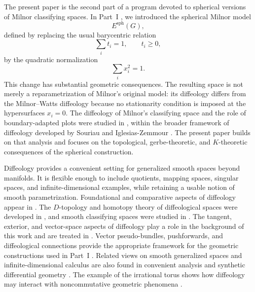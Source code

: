 \documentclass[11pt]{amsart}
\begin{document}
The present paper is the second part of a program devoted to spherical
versions of Milnor classifying spaces. In Part~I \cite{Magnot-MilnorI}, we
introduced the spherical Milnor model
\[
E^{\mathrm{sph}}(G),
\]
defined by replacing the usual barycentric relation
\[
\sum_i t_i=1,\qquad t_i\geq0,
\]
by the quadratic normalization
\[
\sum_i x_i^2=1.
\]
This change has substantial geometric consequences. The resulting space is not
merely a reparametrization of Milnor's original model: its diffeology differs
from the Milnor--Watts diffeology because no stationarity condition is imposed
at the hypersurfaces \(x_i=0\). The diffeology of Milnor's classifying space
and the role of boundary-adapted plots were studied in \cite{MagnotWatts2017},
within the broader framework of diffeology developed by Souriau and
Iglesias-Zemmour \cite{Souriau1980,IglesiasZemmour2013}. The present paper
builds on that analysis and focuses on the topological, gerbe-theoretic, and
\(K\)-theoretic consequences of the spherical construction.

Diffeology provides a convenient setting for generalized smooth spaces beyond
manifolds. It is flexible enough to include quotients, mapping spaces,
singular spaces, and infinite-dimensional examples, while retaining a usable
notion of smooth parametrization. Foundational and comparative aspects of
diffeology appear in \cite{Hector1995,Stacey2011,Watts2012Thesis,GMW2023}.
The \(D\)-topology and homotopy theory of diffeological spaces were developed
in \cite{ChristensenSinnamonWu2014,ChristensenWu2014Homotopy}, and smooth
classifying spaces were studied in \cite{ChristensenWu2021Classifying}. The
tangent, exterior, and vector-space aspects of diffeology play a role in the
background of this work and are treated in
\cite{ChristensenWu2016Tangent,ChristensenWu2017Filtered,ChristensenWu2019Vector,ChristensenWu2022Exterior}.
Vector pseudo-bundles, pushforwards, and diffeological connections provide the
appropriate framework for the geometric constructions used in Part~I
\cite{Pervova2016,Pervova2017,Pervova2018,Wu2023,MagnotConnections}. Related
views on smooth generalized spaces and infinite-dimensional calculus are also
found in convenient analysis and synthetic differential geometry
\cite{KrieglMichor1997,Kock2006}. The example of the irrational torus shows
how diffeology may interact with noncommutative geometric phenomena
\cite{IglesiasLaffineurZemmour2020}.
\end{document}

